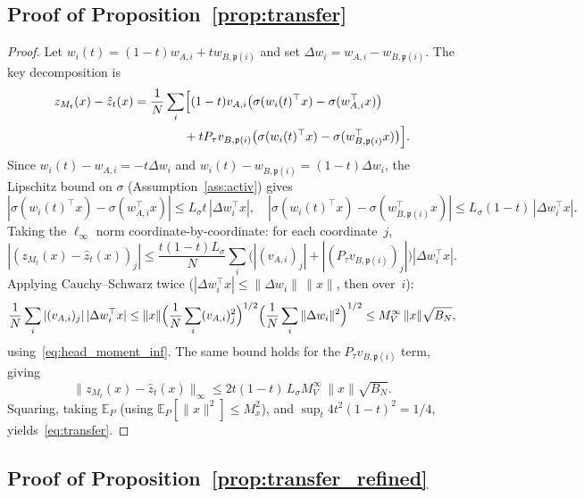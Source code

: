 \documentclass[11pt]{article}
\newcommand{\E}{\mathbb{E}}
\newcommand{\nperm}{\mathfrak{p}}  %
\begin{document}
\subsection{Proof of Proposition~\ref{prop:transfer}}\label{sec:transfer}
\begin{proof}
Let $w_i(t) = (1-t)w_{A,i} + tw_{B,\nperm(i)}$ and set
$\Delta w_i = w_{A,i} - w_{B,\nperm(i)}$.  The key decomposition is
\begin{align*}
  z_{M_t}(x) - \hat z_t(x)
  &= \frac{1}{N}\sum_i \Bigl[
    (1-t)v_{A,i}\bigl(\sigma(w_i(t)^\top x) - \sigma(w_{A,i}^{\top}x)\bigr) \\
  &\qquad\qquad
    + tP_\tau v_{B,\nperm(i)}\bigl(\sigma(w_i(t)^\top x)
      - \sigma(w_{B,\nperm(i)}^{\top}x)\bigr)
  \Bigr].
\end{align*}
Since $w_i(t) - w_{A,i} = -t\Delta w_i$ and
$w_i(t) - w_{B,\nperm(i)} = (1-t)\Delta w_i$, the Lipschitz bound on
$\sigma$ (Assumption~\ref{ass:activ}) gives
\[
  |\sigma(w_i(t)^\top x) - \sigma(w_{A,i}^{\top}x)|
  \le L_\sigma t\,|\Delta w_i^\top x|, \quad
  |\sigma(w_i(t)^\top x) - \sigma(w_{B,\nperm(i)}^{\top}x)|
  \le L_\sigma(1-t)\,|\Delta w_i^\top x|.
\]
Taking the $\ell_\infty$ norm coordinate-by-coordinate: for each
coordinate~$j$,
\[
  |(z_{M_t}(x) - \hat z_t(x))_j|
  \le \frac{t(1-t)L_\sigma}{N}
    \sum_i \bigl(|(v_{A,i})_j| + |(P_\tau v_{B,\nperm(i)})_j|\bigr)|\Delta w_i^\top x|.
\]
Applying Cauchy--Schwarz twice ($|\Delta w_i^\top x| \le \|\Delta w_i\|\,\|x\|$,
then over~$i$):
\[
  \frac{1}{N}\sum_i |(v_{A,i})_j|\,|\Delta w_i^\top x|
  \le \|x\|\Bigl(\frac{1}{N}\sum_i (v_{A,i})_j^2\Bigr)^{1/2}
    \Bigl(\frac{1}{N}\sum_i\|\Delta w_i\|^2\Bigr)^{1/2}
  \le M_V^\infty\,\|x\|\sqrt{B_N},
\]
using~\eqref{eq:head_moment_inf}.
The same bound holds for the $P_\tau v_{B,\nperm(i)}$ term, giving
\[
  \|z_{M_t}(x) - \hat z_t(x)\|_\infty
  \le 2t(1-t)\,L_\sigma M_V^\infty\,\|x\|\sqrt{B_N}.
\]
Squaring, taking $\E_P$ (using $\E_P[\|x\|^2] \le M_x^2$),
and $\sup_t 4t^2(1-t)^2 = 1/4$, yields~\eqref{eq:transfer}.
\end{proof}

\subsection{Proof of Proposition~\ref{prop:transfer_refined}}
\label{sec:proof_transfer_refined}
\end{document}
